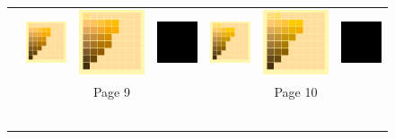 \begin{figure}[t!]
{\begin{tabular}{ccccccc}
			\\ \raisebox{0.5cm}[0pt][0pt]{\parbox[c][0pt][c]{0cm}{\hspace{-1.5em}\\[20pt]}\par}
			&
			\includegraphics[width=.155\linewidth]{img/results_uplift_page09_originalFL11.png}
			&
			\includegraphics[width=.155\linewidth]{img/results_uplift_page09_ourFL11.png}
			& 
			\includegraphics[width=.155\linewidth]{img/toDelete.png}
			&\quad
			\includegraphics[width=.155\linewidth]{img/results_uplift_page10_originalFL11.png}
			&
			\includegraphics[width=.155\linewidth]{img/results_uplift_page10_ourFL11.png}
			&
			\includegraphics[width=.155\linewidth]{img/toDelete.png}\\
			& & Page 9 & & & Page 10 & \\
			\vspace{0.1em} \\ 
			\raisebox{0.4cm}[0pt][0pt]{\parbox[c][0pt][c]{0cm}{\hspace{-1.5em}\\[20pt]}\par}

\end{tabular}}
\end{figure}
